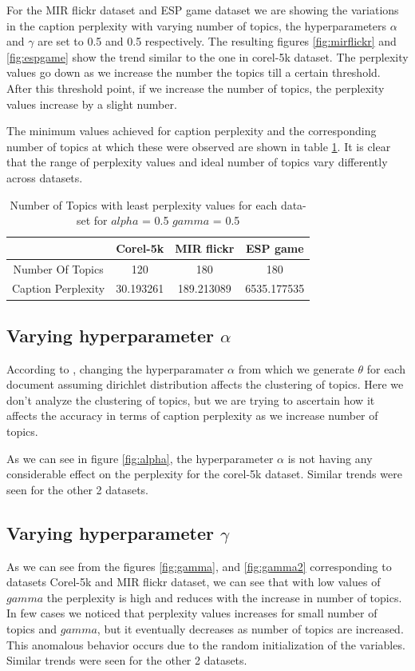 \documentclass[journal]{IEEEtran}
\begin{document}
For the MIR flickr dataset and  ESP game dataset we are showing the variations in the caption perplexity with varying number of topics, the hyperparameters $\alpha$ and $\gamma$ are set to 0.5 and 0.5 respectively. The resulting figures \ref{fig:mirflickr} and \ref{fig:espgame} show the trend similar to the one in corel-5k dataset. The perplexity values go down as we increase the number the topics till a certain threshold. After this threshold point, if we increase the number of topics, the perplexity values increase by a slight number. 

The minimum values achieved for caption perplexity and the corresponding number of topics at which these were observed are shown in table \ref{tab:spet}. It is clear that the range of perplexity values and ideal number of topics vary differently across datasets.

\begin{table}[htb]
    \captionsetup{labelsep=period}
    \centering
    \begin{tabular}{|c|c|c|c|}
        \hline
        & Corel-5k & MIR flickr  & ESP game  \\
        \hline
        Number Of Topics & 120& 180 & 180\\
         \hline
         Caption Perplexity & 30.193261 & 189.213089 & 6535.177535\\
         \hline
    \end{tabular}
    \caption{Number of Topics with least perplexity values for each data-set for $alpha$ = 0.5 $gamma$ = 0.5}
    \label{tab:spet}
\end{table}

\subsection{Varying hyperparameter $\alpha$}
According to \cite{blei2003latent}, changing the hyperparamater $\alpha$ from which we generate $\theta$ for each document assuming dirichlet distribution affects the clustering of topics. Here we don't analyze the clustering of topics, but we are trying to ascertain how it affects the accuracy in terms of caption perplexity as we increase number of topics. 

As we can see in figure \ref{fig:alpha}, the hyperparameter $\alpha$ is not having any considerable effect on the perplexity for the corel-5k dataset. Similar trends were seen for the other 2 datasets.

\subsection{Varying hyperparameter $\gamma$}
As we can see from the figures \ref{fig:gamma}, and \ref{fig:gamma2} corresponding to datasets Corel-5k and MIR flickr dataset, we can see that with low values of $gamma$ the perplexity is high and reduces with  the increase in number of topics.
In few cases we noticed that perplexity values increases for small number of topics and $gamma$, but it eventually decreases as number of topics are increased. This anomalous behavior occurs due to the random initialization of the variables. Similar trends were seen for the other 2 datasets.
\end{document}
